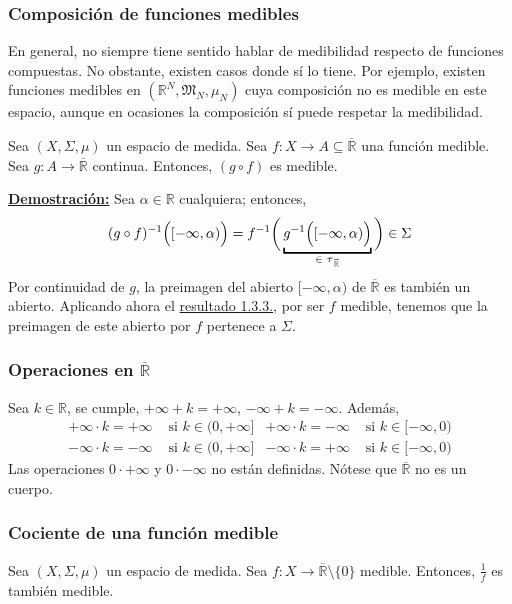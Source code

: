\documentclass[12pt,a4paper]{article}
\newcommand{\R}{\mathbb{R}}
\newcounter{unit}[section]
\newcounter{chapter}[unit]
\renewcommand{\theunit}{\arabic{unit}}
\renewcommand{\thechapter}{\arabic{chapter}}
\renewcommand{\thesubsubsection}{\theunit.\thechapter.\arabic{subsubsection}}
\newcommand{\result}[1]{%
  \subsubsection{#1}%
  \label{result:\thesubsubsection}
}
\newcommand{\dem}{
    \noindent \underline{\textbf{Demostración:}}
}
\begin{document}
\vspace{6mm}
\result{Composición de funciones medibles}
\hspace{3mm} En general, no siempre tiene sentido hablar de medibilidad respecto de funciones compuestas. No obstante, existen casos donde sí lo tiene. Por ejemplo, existen funciones medibles en $(\R^N, \mathfrak{M}_N, \mu_N)$ cuya composición no es medible en este espacio, aunque en ocasiones la composición sí puede respetar la medibilidad.

\vspace{2mm} Sea $(X, \Sigma, \mu)$ un espacio de medida. Sea $f : X \longrightarrow A \subseteq \overline{\R}$ una función medible. Sea $g : A \longrightarrow \overline{\R}$ continua. Entonces, $(g \circ f)$ es medible.

\newpage \dem Sea $\alpha \in \R$ cualquiera; entonces,
$$(g \circ f)^{-1}\Big([-\infty, \alpha)\Big) = f^{-1}\bigg(\underbracket{g^{-1}\Big([-\infty, \alpha)\Big)}_{\in \hspace{1mm} \tau_{\hspace{0.5mm} \overline{\R}}}\bigg) \in \Sigma$$
\indent Por continuidad de $g$, la preimagen del abierto $[-\infty, \alpha)$ de $\overline{\R}$ es también un abierto. Aplicando ahora el \hyperref[result:1.3.3]{resultado 1.3.3.}, por ser $f$ medible, tenemos que la preimagen de este abierto por $f$ pertenece a $\Sigma$.

\vspace{6mm}
\result{Operaciones en \texorpdfstring{$\overline{\R}$}{R}}
Sea $k \in \R$, se cumple,  $+\infty + k = +\infty$, \hspace{1mm}$-\infty + k = -\infty$. \hspace{1mm} Además,
\begin{align*}
    +\infty \cdot k = +\infty &\text{ si } k \in (0, +\infty] & 
    +\infty \cdot k = -\infty &\text{ si } k \in [-\infty, 0) \\
    -\infty \cdot k = -\infty &\text{ si } k \in (0, +\infty] & 
    -\infty \cdot k = +\infty &\text{ si } k \in [-\infty, 0)    
\end{align*}
Las operaciones $0 \cdot +\infty$ y $0 \cdot -\infty$ no están definidas. Nótese que $\overline{\R}$ no es un cuerpo.

\vspace{6mm}
\result{Cociente de una función medible}
\hspace{3mm} Sea $(X, \Sigma, \mu)$ un espacio de medida. Sea $f: X \longrightarrow \overline{\R}\setminus\{0\}$ medible. Entonces, $\frac{1}{f}$ es también medible.
\end{document}
